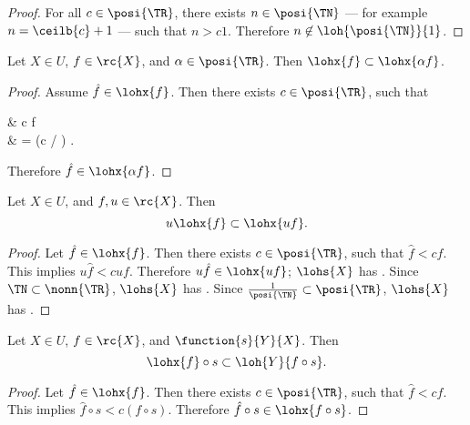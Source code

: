 \documentclass[b5paper, english, oneside]{memoir}
\begin{document}
\begin{proof}
For all $c \in \posi{\TR}$, there exists $n \in \posi{\TN}$ --- for example $n = \ceilb{c} + 1$ --- such that $n > c 1$. Therefore $n \not\in \loh{\posi{\TN}}{1}$. 
\end{proof}

\begin{lemma}
\label{LinearScaleInvariance}
Let $X \in U$, $f \in \rc{X}$, and $\alpha \in \posi{\TR}$. Then $\lohx{f} \subset \lohx{\alpha f}$. 
\end{lemma}

\begin{proof}
Assume $\hat{f} \in \lohx{f}$. Then there exists $c \in \posi{\TR}$, such that
\begin{eqs}
 & \lt c f \\
{} & = (c / \alpha) .
\end{eqs}
Therefore $\hat{f} \in \lohx{\alpha f}$. 
\end{proof}

\begin{lemma}
\label{LinearSubHomogenuity}
Let $X \in U$, and $f, u \in \rc{X}$. Then  
\begin{equation}
u \lohx{f} \subset \lohx{uf}. 
\end{equation} 
\end{lemma}

\begin{proof}
Let $\hat{f} \in \lohx{f}$. Then there exists $c \in \posi{\TR}$, such that $\hat{f} \lt c f$. This implies $u\hat{f} \lt c uf$. Therefore $u\hat{f} \in \lohx{uf}$; $\lohs{X}$ has . Since $\TN \subset \nonn{\TR}$, $\lohs{X}$ has . Since $\frac{1}{\posi{\TN}} \subset \posi{\TR}$, $\lohs{X}$ has .
\end{proof}

\begin{lemma}
\label{LinearSubComposability}
Let $X \in U$, $f \in \rc{X}$, and $\function{s}{Y}{X}$. Then 
\begin{equation}
\lohx{f} \circ s \subset \loh{Y}{f \circ s}.
\end{equation}
\end{lemma}

\begin{proof}
Let $\hat{f} \in \lohx{f}$. Then there exists $c \in \posi{\TR}$, such that $\hat{f} \lt c f$. This implies $\hat{f} \circ s \lt c (f \circ s)$. Therefore $\hat{f} \circ s \in \lohx{f \circ s}$.
\end{proof}
\end{document}
